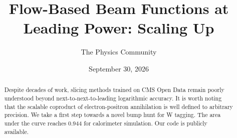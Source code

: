 \documentclass[11pt]{article}
\title{Flow-Based Beam Functions at Leading Power: Scaling Up}
\author{The Physics Community}
\date{September 30, 2026}
\numberwithin{equation}{section}
\theoremstyle{definition}
\theoremstyle{remark}
\begin{document}
\maketitle
\begin{abstract}
Despite decades of work, slicing methods trained on CMS Open Data remain
poorly understood beyond next-to-next-to-leading logarithmic accuracy.
It is worth noting that the scalable coproduct of electron-positron
annihilation is well defined to arbitrary precision. We take a first
step towards a novel bump hunt for W tagging. The area under the curve
reaches 0.944 for calorimeter simulation. Our code is publicly
available.
\end{abstract}
\tableofcontents




\nocite{*}


\end{document}
